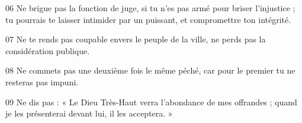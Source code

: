 
06 Ne brigue pas la fonction de juge, si tu n’es pas armé pour briser l’injustice ; tu pourrais te laisser intimider par un puissant, et compromettre ton intégrité.

07 Ne te rends pas coupable envers le peuple de la ville, ne perds pas la considération publique.

08 Ne commets pas une deuxième fois le même péché, car pour le premier tu ne resteras pas impuni.

09 Ne dis pas : « Le Dieu Très-Haut verra l’abondance de mes offrandes ; quand je les présenterai devant lui, il les acceptera. »

